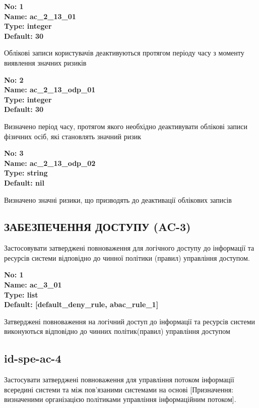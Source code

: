 \documentclass{article}
\begin{document}
\vspace{10pt}
{\footnotesize\bfseries
No: 1\\
Name: ac\_\allowbreak{}2\_\allowbreak{}13\_\allowbreak{}01\\
Type: integer\\
Default: 30
}

{\footnotesize Облікові записи користувачів деактивуються протягом періоду часу з моменту виявлення значних ризиків}


{\footnotesize\bfseries
No: 2\\
Name: ac\_\allowbreak{}2\_\allowbreak{}13\_\allowbreak{}odp\_\allowbreak{}01\\
Type: integer\\
Default: 30
}

{\footnotesize Визначено період часу, протягом якого необхідно деактивувати облікові записи фізичних осіб, які становлять значний ризик}


{\footnotesize\bfseries
No: 3\\
Name: ac\_\allowbreak{}2\_\allowbreak{}13\_\allowbreak{}odp\_\allowbreak{}02\\
Type: string\\
Default: nil
}

{\footnotesize Визначено значні ризики, що призводять до деактивації облікових записів}




\subsection{ЗАБЕЗПЕЧЕННЯ ДОСТУПУ (AC-3)}
Застосовувати затверджені повноваження для логічного доступу до інформації та ресурсів системи відповідно до чинної політики (правил) управління доступом.

\vspace{10pt}
{\footnotesize\bfseries
No: 1\\
Name: ac\_\allowbreak{}3\_\allowbreak{}01\\
Type: list\\
Default: [\textquotedbl{}default\_\allowbreak{}deny\_\allowbreak{}rule\textquotedbl{}, \textquotedbl{}abac\_\allowbreak{}rule\_\allowbreak{}1\textquotedbl{}]
}

{\footnotesize Затверджені повноваження на логічний доступ до інформації та ресурсів системи виконуються відповідно до чинних політик(правил) управління доступом}




\subsection{id-spe-ac-4}
Застосувати затверджені повноваження для управління потоком інформації всередині системи та між пов'язаними системами на основі [Призначення: визначеними організацією політиками управління інформаційним потоком].
\end{document}
